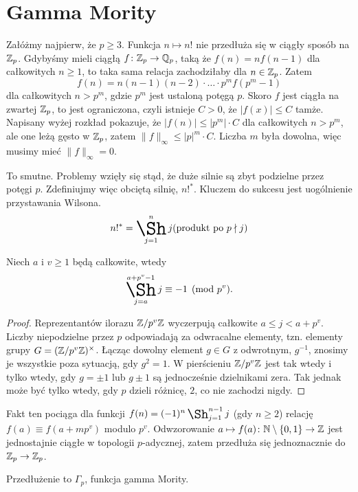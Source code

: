 \section{Gamma Mority}
Załóżmy najpierw, że $p \ge 3$.
Funkcja $n \mapsto n!$ nie przedłuża się w ciągły sposób na $\mathbb Z_p$. Gdybyśmy mieli ciągłą $f \colon \mathbb Z_p \to \mathbb Q_p$, taką że $f(n) = nf(n-1)$ dla całkowitych $n \ge 1$, to taka sama relacja zachodziłaby dla $n \in \mathbb Z_p$.
Zatem
\[
	f(n) = n (n-1)(n-2) \cdot \ldots \cdot p^m f(p^m-1)
\]
dla całkowitych $n > p^m$, gdzie $p^m$ jest ustaloną potęgą $p$.
Skoro $f$ jest ciągła na zwartej $\mathbb Z_p$, to jest ograniczona, czyli istnieje $C > 0$, że $|f(x)| \le C$ tamże.
Napisany wyżej rozkład pokazuje, że $|f(n)| \le |p^m| \cdot C$ dla całkowitych $n > p^m$, ale one leżą gęsto w $\mathbb Z_p$, zatem $\|f\|_\infty \le |p|^m \cdot C$.
Liczba $m$ była dowolna, więc musimy mieć $\|f\|_\infty = 0$.

To smutne. Problemy wzięły się stąd, że duże silnie są zbyt podzielne przez potęgi $p$.
Zdefiniujmy więc {obciętą silnię}, $n!^*$.
Kluczem do sukcesu jest uogólnienie przystawania Wilsona.
\[
	n!^* = \shaprod_{j = 1}^n j \hfill \text{(produkt po } p \nmid j\textrm{)}
\]

\begin{fakt}
	Niech $a$ i $v \ge 1$ będą całkowite, wtedy
	\[
		\shaprod_{j=a}^{a+p^v-1} j \equiv -1 \pmod {p^v}.
	\]
\end{fakt}

\begin{proof}
	Reprezentantów ilorazu $\mathbb Z/p^v \mathbb Z$ wyczerpują całkowite $a \le j < a + p^v$.
	Liczby niepodzielne przez $p$ odpowiadają za odwracalne elementy, tzn. elementy grupy $G = (\mathbb Z/p^v\mathbb Z)^\times$.
	Łącząc dowolny element $g \in G$ z odwrotnym, $g^{-1}$, znosimy je wszystkie poza sytuacją, gdy $g^2 = 1$.
	W pierścieniu $\mathbb Z/p^v \mathbb Z$ jest tak wtedy i tylko wtedy, gdy $g = \pm 1$ lub $g \pm 1$ są jednocześnie dzielnikami zera.
	Tak jednak może być tylko wtedy, gdy $p$ dzieli różnicę, $2$, co nie zachodzi nigdy.
\end{proof}

Fakt ten pociąga dla funkcji $f(n) = (-1)^n \shaprod_{j=1}^{n-1} j$ (gdy $n \ge 2$) relację $f(a) \equiv f(a+mp^v)$ modulo $p^v$.
Odwzorowanie $a \mapsto f(a) \colon \mathbb N \setminus\{0,1\} \to \mathbb Z$ jest jednostajnie ciągłe w topologii $p$-adycznej, zatem przedłuża się jednoznacznie do $\mathbb Z_p \to \mathbb Z_p$.

\begin{definicja}
	Przedłużenie to $\Gamma_p$, funkcja gamma Mority.
\end{definicja}

